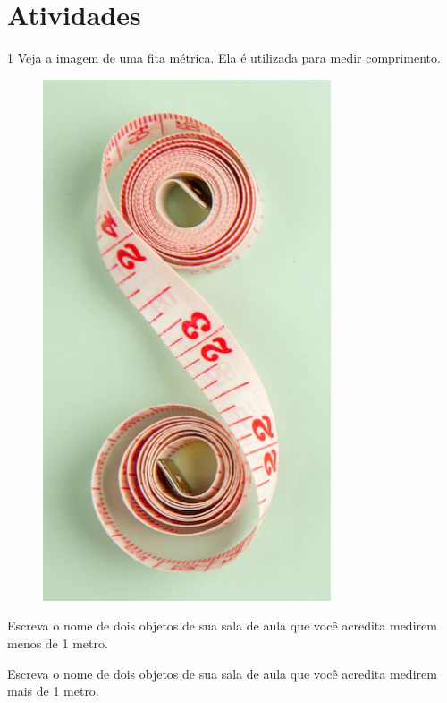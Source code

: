 
\section*{Atividades}

\num{1} Veja a imagem de uma fita métrica. Ela é utilizada para medir comprimento.

\begin{figure}[htpb!]
\centering
\includegraphics[width=.3\textwidth]{./media/image41.png}
\end{figure}

\begin{escolha}
\item Escreva o nome de dois objetos de sua sala de aula que você acredita
  medirem menos de 1 metro.

\item Escreva o nome de dois objetos de sua sala de aula que você acredita
  medirem mais de 1 metro.
\end{escolha}

